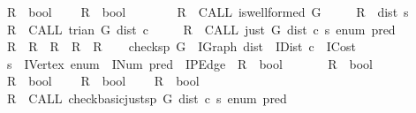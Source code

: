 \begin{isabellebody}
\ \ \ \ R{}\ {\isacharcolon}{\isacharcolon}\ bool\isanewline
\ \ \ \ R{}\ {\isacharcolon}{\isacharcolon}\ bool\isanewline
\ \ \ {\isachardoublequoteopen}\isanewline
\ \ \ \ {\isasymacute}R{}\ {\isacharcolon}{\isacharequal}{\isacharequal}\ CALL\ is{\isacharunderscore}wellformed\ {\isacharparenleft}{\isasymacute}G{\isacharparenright}\ {\isacharsemicolon}{\isacharsemicolon}\isanewline
\ \ \ \ {\isasymacute}R{}\ {\isacharcolon}{\isacharequal}{\isacharequal}\ {\isasymacute}dist\ {\isasymacute}s\ {\isasymle}\ {}\ {\isacharsemicolon}{\isacharsemicolon}\isanewline
\ \ \ \ {\isasymacute}R{}\ {\isacharcolon}{\isacharequal}{\isacharequal}\ CALL\ trian\ {\isacharparenleft}{\isasymacute}G{\isacharcomma}\ {\isasymacute}dist{\isacharcomma}\ {\isasymacute}c{\isacharparenright}\ {\isacharsemicolon}{\isacharsemicolon}\isanewline
\ \ \ \ {\isasymacute}R{}\ {\isacharcolon}{\isacharequal}{\isacharequal}\ CALL\ just\ {\isacharparenleft}{\isasymacute}G{\isacharcomma}\ {\isasymacute}dist{\isacharcomma}\ {\isasymacute}c{\isacharcomma}\ {\isasymacute}s{\isacharcomma}\ {\isasymacute}enum{\isacharcomma}\ {\isasymacute}pred{\isacharparenright}\ {\isacharsemicolon}{\isacharsemicolon}\isanewline
\ \ \ \ {\isasymacute}R\ {\isacharcolon}{\isacharequal}{\isacharequal}\ {\isasymacute}R{}\ {\isasymand}\ {\isasymacute}R{}\ {\isasymand}\ {\isasymacute}R{}\ {\isasymand}\ {\isasymacute}R{}\isanewline
\ \ {\isachardoublequoteclose}\isanewline
\isanewline
{}\isamarkupfalse%
\ check{\isacharunderscore}sp\ {\isacharparenleft}G\ {\isacharcolon}{\isacharcolon}\ IGraph{\isacharcomma}\ dist\ {\isacharcolon}{\isacharcolon}\ IDist{\isacharcomma}\ c\ {\isacharcolon}{\isacharcolon}\ ICost{\isacharcomma}\ \isanewline
\ \ \ \ s\ {\isacharcolon}{\isacharcolon}\ IVertex{\isacharcomma}\ enum\ {\isacharcolon}{\isacharcolon}\ INum{\isacharcomma}\ pred\ {\isacharcolon}{\isacharcolon}\ IPEdge\ {\isacharbar}\ R\ {\isacharcolon}{\isacharcolon}\ bool{\isacharparenright}\isanewline
\ \ \isanewline
\ \ \ \ R{}\ {\isacharcolon}{\isacharcolon}\ bool\isanewline
\ \ \ \ R{}\ {\isacharcolon}{\isacharcolon}\ bool\isanewline
\ \ \ \ R{}\ {\isacharcolon}{\isacharcolon}\ bool\isanewline
\ \ \ \ R{}\ {\isacharcolon}{\isacharcolon}\ bool\isanewline
\ \ \ {\isachardoublequoteopen}\isanewline
\ \ \ \ {\isasymacute}R{}\ {\isacharcolon}{\isacharequal}{\isacharequal}\ CALL\ check{\isacharunderscore}basic{\isacharunderscore}just{\isacharunderscore}sp\ {\isacharparenleft}{\isasymacute}G{\isacharcomma}\ {\isasymacute}dist{\isacharcomma}\ {\isasymacute}c{\isacharcomma}\ {\isasymacute}s{\isacharcomma}\ {\isasymacute}enum{\isacharcomma}\ {\isasymacute}pred{\isacharparenright}\ {\isacharsemicolon}{\isacharsemicolon}\isanewline

\end{isabellebody}
